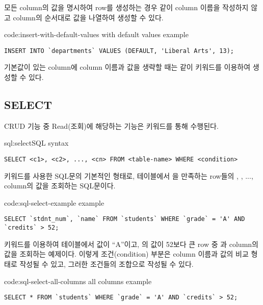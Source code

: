 모든 column의 값을 명시하여 row를 생성하는 경우 \와 같이 column 이름을 작성하지 않고 column의 순서대로 값을 나열하여 생성할 수 있다.

\begin{code}{code:insert-with-default-values}{ with default values example}
\begin{verbatim}
INSERT INTO `departments` VALUES (DEFAULT, 'Liberal Arts', 13);
\end{verbatim}
\end{code}

기본값이 있는 column에 column 이름과 값을 생략할 때는 \와 같이  키워드를 이용하여 생성할 수 있다.

\subsection*{SELECT}

CRUD 기능 중 Read(조회)에 해당하는 기능은  키워드를 통해 수행된다.

\begin{sql}{sql:select}{SQL  syntax}
\begin{verbatim}
SELECT <c1>, <c2>, ..., <cn> FROM <table-name> WHERE <condition>
\end{verbatim}
\end{sql}

\는  키워드를 사용한 SQL문의 기본적인 형태로,  테이블에서 을 만족하는 row들의 , , ...,  column의 값을 조회하는 SQL문이다.

\begin{code}{code:sql-select-example}{ example}
\begin{verbatim}
SELECT `stdnt_num`, `name` FROM `students` WHERE `grade` = 'A' AND `credits` > 52;
\end{verbatim}
\end{code}

\은  키워드를 이용하여  테이블에서  값이 ``A''이고, 의 값이 52보다 큰 row 중 과  column의 값을 조회하는 예제이다. 이렇게 조건(condition) 부분은 column 이름과 값의 비교 형태로 작성될 수 있고, 그러한 조건들의 조합으로 작성될 수 있다.

\begin{code}{code:sql-select-all-columns}{ all columns example}
\begin{verbatim}
SELECT * FROM `students` WHERE `grade` = 'A' AND `credits` > 52;
\end{verbatim}
\end{code}

